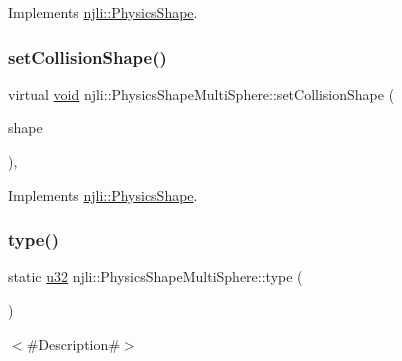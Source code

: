 Implements \mbox{\hyperlink{classnjli_1_1_physics_shape_a2ac8a109a5ad67ee79f40ce8f28337cf}{njli\+::\+Physics\+Shape}}.

\mbox{\label{classnjli_1_1_physics_shape_multi_sphere_ae54e42a11d5b7737dad326aa1c11b2ad}} 
\subsubsection{\texorpdfstring{set\+Collision\+Shape()}{setCollisionShape()}}
{\footnotesize\ttfamily virtual \mbox{\hyperlink{_thread_8h_af1e856da2e658414cb2456cb6f7ebc66}{void}} njli\+::\+Physics\+Shape\+Multi\+Sphere\+::set\+Collision\+Shape (\begin{DoxyParamCaption}\item[{const bt\+Collision\+Shape \&}]{shape }\end{DoxyParamCaption})\hspace{0.3cm}{\ttfamily [protected]}, {\ttfamily [virtual]}}



Implements \mbox{\hyperlink{classnjli_1_1_physics_shape_a441e82a42f3b588a409c3b6c41288abd}{njli\+::\+Physics\+Shape}}.

\mbox{\label{classnjli_1_1_physics_shape_multi_sphere_ab3bdb3d0b0d07962fc85babae7026614}} 
\subsubsection{\texorpdfstring{type()}{type()}}
{\footnotesize\ttfamily static \mbox{\hyperlink{_util_8h_a10e94b422ef0c20dcdec20d31a1f5049}{u32}} njli\+::\+Physics\+Shape\+Multi\+Sphere\+::type (\begin{DoxyParamCaption}{ }\end{DoxyParamCaption})\hspace{0.3cm}{\ttfamily [static]}}

$<$\#\+Description\#$>$

